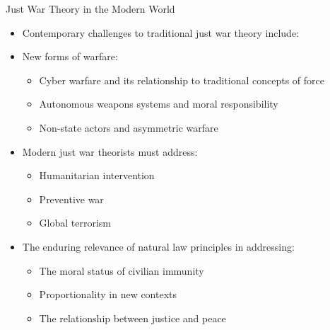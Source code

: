 \documentclass{beamer}
\begin{document}
\begin{frame}{Just War Theory in the Modern World}
    \begin{itemize}
        \item Contemporary challenges to traditional just war theory include:
        
        \item New forms of warfare:
        \begin{itemize}
            \item Cyber warfare and its relationship to traditional concepts of force
            \item Autonomous weapons systems and moral responsibility
            \item Non-state actors and asymmetric warfare
        \end{itemize}
        
        \item Modern just war theorists must address:
            \begin{itemize}
                \item Humanitarian intervention
                \item Preventive war
                \item Global terrorism
            \end{itemize}
        
        \item The enduring relevance of natural law principles in addressing:
            \begin{itemize}
                \item The moral status of civilian immunity
                \item Proportionality in new contexts
                \item The relationship between justice and peace
            \end{itemize}
    \end{itemize}
\end{frame}
\end{document}
